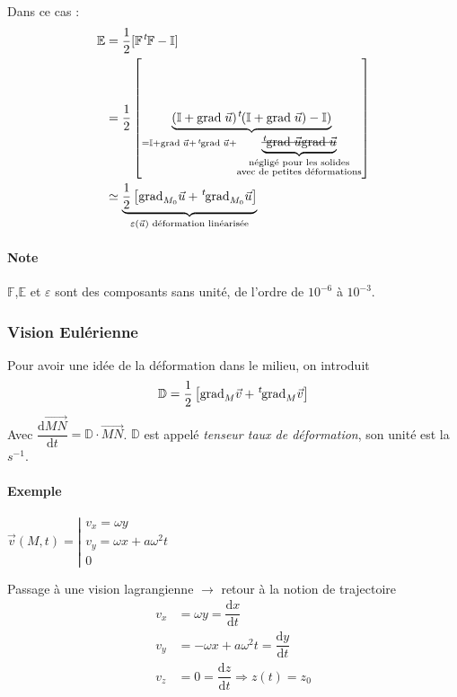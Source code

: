 \documentclass{article}
\newcommand{\deriv}{\mathrm{d}}
\newcommand{\grad}{\text{grad}\;}
\newcommand{\transpose}{\hspace{.1em}{}^t\hspace{-.1em}}
\begin{document}
Dans ce cas :
\begin{align*}
\mathbb{E} & = \dfrac{1}{2}[\mathbb{F}\transpose \mathbb{F} - \mathbb{I}]\\
& = \dfrac{1}{2} \left[ \underbrace{(\mathbb{I} + \grad \vec{u})\transpose(\mathbb{I}+\grad \vec{u}) - \mathbb{I})}_{= \mathbb{I}+ \grad \vec{u} + \transpose \grad \vec{u} + \underbrace{\text{\sout{$\transpose \grad \vec{u}\grad \vec{u}$}}}_{\substack{\text{négligé pour les solides}\\\text{avec de petites déformations}}}} \right]\\
& \simeq \underbrace{\dfrac{1}{2} \left[ \text{grad}_{M_0} \vec{u} + \transpose \text{grad}_{M_0} \vec{u} \right]}_{\varepsilon (\vec{u})\text{ déformation linéarisée}}\\
\end{align*}

\paragraph{Note}
$\mathbb{F}$,$\mathbb{E}$ et $\varepsilon$ sont des composants sans unité, de l'ordre de $10^{-6}$ à $10^{-3}$.

\subsubsection{Vision Eulérienne}
Pour avoir une idée de la déformation dans le milieu, on introduit
\[\mathbb{D} = \dfrac{1}{2} \left[ \text{grad}_M \vec{v} + \transpose\text{grad}_M \vec{v} \right]\]
Avec $\dfrac{\deriv  \overrightarrow{MN}}{\deriv t} = \mathbb{D} \cdot \overrightarrow{MN}$. $\mathbb{D}$ est appelé \emph{tenseur taux de déformation}, son unité est la $s^{-1}$.


\paragraph{Exemple} $\vec{v}(M,t) = \left\lvert \begin{matrix}
v_x = \omega y\\
v_y = \omega x + a\omega^2 t\\
0
\end{matrix}\right.$


Passage à une vision lagrangienne $\to$ retour à la notion de trajectoire
\begin{align*}
v_x & = \omega y = \dfrac{\deriv x}{\deriv t}\\
v_y & = -\omega x + a\omega^2 t = \dfrac{\deriv y}{\deriv	t}\\
v_z & = 0 = \dfrac{\deriv z}{\deriv t} \Rightarrow z(t) = z_0
\end{align*}
\end{document}
